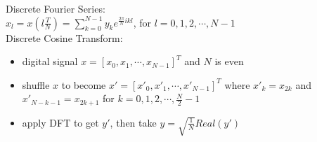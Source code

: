 Discrete Fourier Series:\\
$x_l=x(l\frac{T}{N})=\sum^{N-1}_{k=0}y_ke^{\frac{2\pi}{N}ikl}$, for $l=0,1,2,\cdots,N-1$\\

Discrete Cosine Transform:
\begin{itemize}
    \item digital signal $x=[x_0,x_1,\cdots,x_{N-1}]^T$ and $N$ is even
    \item shuffle $x$ to become $x'=[x'_0,x'_1,\cdots,x'_{N-1}]^T$ where $x'_k=x_{2k}$ and $x'_{N-k-1}=x_{2k+1}$ for $k=0,1,2,\cdots,\frac{N}{2}-1$
    \item apply DFT to get $y'$, then take $y=\sqrt{\frac{1}{N}}Real(y')$
\end{itemize}

